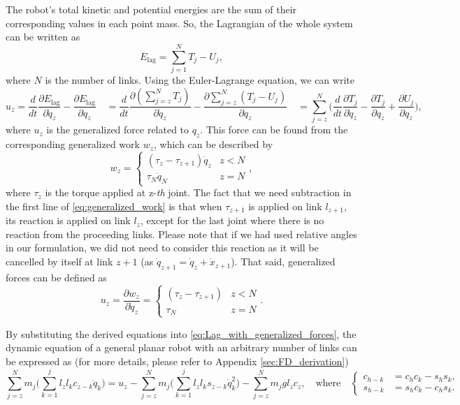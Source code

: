 \documentclass[10pt,a4paper]{article} %
\begin{document}
The robot's total kinetic and potential energies are the sum of their corresponding values in each point mass. So, the Lagrangian of the whole system can be written as 
\begin{equation*}
	E_{\text{lag}} = \sum_{j=1}^N T_j - U_j,
\end{equation*}
where $N$ is the number of links. Using the Euler-Lagrange equation, we can write 
\begin{equation}
	u_z = \frac{d}{dt} \frac{\partial E_{\text{lag}}}{\partial \dot{q}_z} - \frac{\partial E_{\text{lag}}}{\partial q_z}
	\quad= \frac{d}{dt} \frac{\partial (\sum_{j=z}^N T_j)}{\partial \dot{q}_z} - \frac{\partial \sum_{j=z}^N (T_j-U_j)}{\partial q_z}
	\quad= \sum_{j=z}^N \Big(\frac{d}{dt} \frac{\partial T_j}{\partial \dot{q}_z} - \frac{\partial T_j}{\partial q_z} + \frac{\partial U_j}{\partial q_z}\Big),
	\label{eq:Lag_with_generalized_forces} 
\end{equation}
where $u_z$ is the generalized force related to $q_z$. This force can be found from the corresponding generalized work $w_z$, which can be described by
\begin{equation}\label{eq:generalized_work}
	w_z = \begin{cases} (\tau_{z}-\tau_{z+1})\dot{q}_z & z<N \\ \tau_{N}\dot{q}_N & z=N\end{cases}, 
\end{equation}
where $\tau_z$ is the torque applied at z-\emph{th} joint. The fact that we need subtraction in the first line of \eqref{eq:generalized_work} is that when $\tau_{z+1}$ is applied on link $l_{z+1}$, its reaction is applied on link $l_z$, except for the last joint where there is no reaction from the proceeding links. Please note that if we had used relative angles in our formulation, we did not need to consider this reaction as it will be cancelled by itself at link $z+1$ (as $\dot{q}_{z+1} = \dot{q}_z + \dot{x}_{z+1}$). That said, generalized forces can be defined as
\begin{equation*}
    u_z = \frac{\partial w_z}{\partial \dot{q}_z} = \begin{cases} (\tau_{z}-\tau_{z+1}) & z<N \\ \tau_{N} & z=N\end{cases}. 
\end{equation*}

By substituting the derived equations into \eqref{eq:Lag_with_generalized_forces}, the dynamic equation of a general planar robot with an arbitrary number of links can be expressed as (for more details, please refer to Appendix \ref{sec:FD_derivation})
\begin{equation}
	\sum_{j=z}^{N}m_j \Big(\sum_{k=1}^{j}l_zl_k c_{z-k}\ddot{q}_k\Big) = 
	u_z - \sum_{j=z}^{N}m_j \Big(\sum_{k=1}^{j} l_zl_k s_{z-k}\dot{q}_k^2\Big) -  \sum_{j=z}^{N}m_j g l_z c_z,
	\quad\text{where}\quad
	\left\{
	{
	\begin{aligned}
	c_{h-k} &= c_h c_k - s_h s_k,\\
	s_{h-k} &= s_h c_k - c_h s_k.
	\end{aligned}
	}\right.
	\label{eq:arranged_dyn_eq}
\end{equation}
\end{document}

